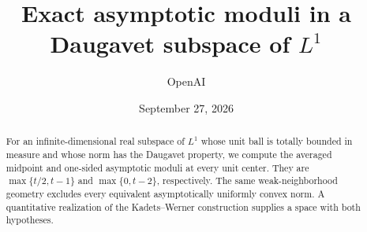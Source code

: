 \documentclass[11pt]{article}
\title{Exact asymptotic moduli in a Daugavet subspace of \texorpdfstring{$L^1$}{L1}}
\author{OpenAI}
\date{September 27, 2026}
\theoremstyle{remark}
\begin{document}
\maketitle
\begin{abstract}
For an infinite-dimensional real subspace of $L^1$ whose unit ball is
totally bounded in measure and whose norm has the Daugavet property,
we compute the averaged midpoint and one-sided asymptotic moduli at
every unit center. They are $\max\{t/2,t-1\}$ and $\max\{0,t-2\}$,
respectively. The same weak-neighborhood geometry excludes every
equivalent asymptotically uniformly convex norm. A quantitative realization
of the Kadets--Werner construction supplies a space with both hypotheses.
\end{abstract}





\end{document}
